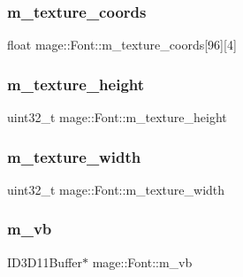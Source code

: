 \hypertarget{classmage_1_1_font_a6b03de184fbf6fa4e663d711e86656f0}{}\label{classmage_1_1_font_a6b03de184fbf6fa4e663d711e86656f0} 
\subsubsection{\texorpdfstring{m\+\_\+texture\+\_\+coords}{m\_texture\_coords}}
{\footnotesize\ttfamily float mage\+::\+Font\+::m\+\_\+texture\+\_\+coords\mbox{[}96\mbox{]}\mbox{[}4\mbox{]}\hspace{0.3cm}{\ttfamily [private]}}

\hypertarget{classmage_1_1_font_afcc7dba6d0991eca65a32d55b6cba503}{}\label{classmage_1_1_font_afcc7dba6d0991eca65a32d55b6cba503} 
\subsubsection{\texorpdfstring{m\+\_\+texture\+\_\+height}{m\_texture\_height}}
{\footnotesize\ttfamily uint32\+\_\+t mage\+::\+Font\+::m\+\_\+texture\+\_\+height\hspace{0.3cm}{\ttfamily [private]}}

\hypertarget{classmage_1_1_font_ab74c50dc44037c95c7a568c9695d520b}{}\label{classmage_1_1_font_ab74c50dc44037c95c7a568c9695d520b} 
\subsubsection{\texorpdfstring{m\+\_\+texture\+\_\+width}{m\_texture\_width}}
{\footnotesize\ttfamily uint32\+\_\+t mage\+::\+Font\+::m\+\_\+texture\+\_\+width\hspace{0.3cm}{\ttfamily [private]}}

\hypertarget{classmage_1_1_font_ada16cf68ca1fe4b3f1b4b2287711bb09}{}\label{classmage_1_1_font_ada16cf68ca1fe4b3f1b4b2287711bb09} 
\subsubsection{\texorpdfstring{m\+\_\+vb}{m\_vb}}
{\footnotesize\ttfamily I\+D3\+D11\+Buffer$\ast$ mage\+::\+Font\+::m\+\_\+vb\hspace{0.3cm}{\ttfamily [private]}}

